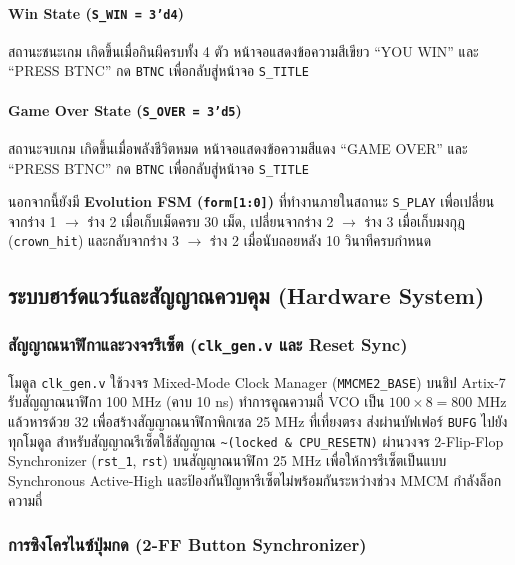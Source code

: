 \documentclass[12pt,a4paper]{article}
\begin{document}
\paragraph{Win State (\texttt{S\_WIN = 3'd4})}
สถานะชนะเกม เกิดขึ้นเมื่อกินผีครบทั้ง 4 ตัว หน้าจอแสดงข้อความสีเขียว ``YOU WIN'' และ ``PRESS BTNC'' กด \texttt{BTNC} เพื่อกลับสู่หน้าจอ \texttt{S\_TITLE}

\paragraph{Game Over State (\texttt{S\_OVER = 3'd5})}
สถานะจบเกม เกิดขึ้นเมื่อพลังชีวิตหมด หน้าจอแสดงข้อความสีแดง ``GAME OVER'' และ ``PRESS BTNC'' กด \texttt{BTNC} เพื่อกลับสู่หน้าจอ \texttt{S\_TITLE}

นอกจากนี้ยังมี \textbf{Evolution FSM (\texttt{form[1:0]})} ที่ทำงานภายในสถานะ \texttt{S\_PLAY} เพื่อเปลี่ยนจากร่าง 1 $\rightarrow$ ร่าง 2 เมื่อเก็บเม็ดครบ 30 เม็ด, เปลี่ยนจากร่าง 2 $\rightarrow$ ร่าง 3 เมื่อเก็บมงกุฎ (\texttt{crown\_hit}) และกลับจากร่าง 3 $\rightarrow$ ร่าง 2 เมื่อนับถอยหลัง 10 วินาทีครบกำหนด

\subsection{ระบบฮาร์ดแวร์และสัญญาณควบคุม (Hardware System)}

\subsubsection{สัญญาณนาฬิกาและวงจรรีเซ็ต (\texttt{clk\_gen.v} และ Reset Sync)}

โมดูล \texttt{clk\_gen.v} ใช้วงจร Mixed-Mode Clock Manager (\texttt{MMCME2\_BASE}) บนชิป Artix-7 รับสัญญาณนาฬิกา 100 MHz (คาบ 10 ns) ทำการคูณความถี่ VCO เป็น $100 \times 8 = 800\text{ MHz}$ แล้วหารด้วย 32 เพื่อสร้างสัญญาณนาฬิกาพิกเซล 25 MHz ที่เที่ยงตรง ส่งผ่านบัฟเฟอร์ \texttt{BUFG} ไปยังทุกโมดูล สำหรับสัญญาณรีเซ็ตใช้สัญญาณ \texttt{\textasciitilde{}(locked \& CPU\_RESETN)} ผ่านวงจร 2-Flip-Flop Synchronizer (\texttt{rst\_1}, \texttt{rst}) บนสัญญาณนาฬิกา 25 MHz เพื่อให้การรีเซ็ตเป็นแบบ Synchronous Active-High และป้องกันปัญหารีเซ็ตไม่พร้อมกันระหว่างช่วง MMCM กำลังล็อกความถี่

\subsubsection{การซิงโครไนซ์ปุ่มกด (2-FF Button Synchronizer)}
\end{document}
